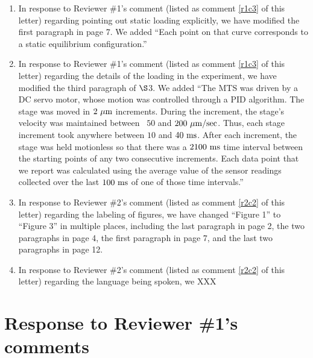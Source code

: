 \documentclass[11pt,letterpaper]{report}
\begin{document}
\begin{enumerate}[label=\textit{Mc.\arabic*}]
%
\item \label{a1} In response to Reviewer \#1's comment (listed as comment \ref{r1c3} of this letter) regarding pointing out static loading explicitly, we have modified the first paragraph in page 7. We added ``Each point on that curve corresponds to a static equilibrium configuration.''
%
\item \label{a2} In response to Reviewer \#1's comment (listed as comment \ref{r1c3} of this letter) regarding the details of the loading in the experiment, we have modified the third paragraph of $\S$3. We added ``The MTS was driven by a DC servo motor, whose motion was controlled through a PID algorithm. The stage was moved in  $2~\mu \rm m$ increments. During the increment, the stage's velocity was maintained between ~$50$ and $200~\mu \rm m/sec$. Thus, each  stage increment took anywhere between $10$ and $40~\rm{ms}$. After each increment, the stage was held motionless so that there was a $2100~\rm{ms}$ time interval  between the starting points of any two consecutive increments. Each data point that we report was calculated using the  average value of the sensor readings collected over the last $100~\rm{ms}$ of one of those time intervals.''
%
\item \label{a3} In response to Reviewer \#2's comment (listed as comment \ref{r2c2} of this letter) regarding the labeling of figures, we have changed ``Figure 1'' to ``Figure 3'' in multiple places, including the last paragraph in page 2, the two paragraphs in page 4, the first paragraph in page 7, and the last two paragraphs in page 12.
%
\item \label{a4} In response to Reviewer \#2's comment (listed as comment \ref{r2c2} of this letter) regarding the language being spoken, we  XXX
\end{enumerate}

\clearpage
\section*{Response to Reviewer \#1's comments}
\label{rev1}
\end{document}

